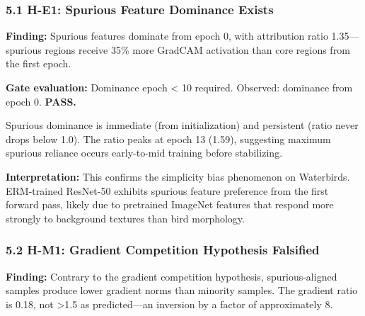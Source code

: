 
\subsubsection{5.1 H-E1: Spurious Feature Dominance Exists}

\textbf{Finding:} Spurious features dominate from epoch 0, with attribution ratio 1.35---spurious regions receive 35\% more GradCAM activation than core regions from the first epoch.

\begin{table}[htbp]
\centering
{}
\end{table}

\textbf{Gate evaluation:} Dominance epoch < 10 required. Observed: dominance from epoch 0. \textbf{PASS.}

Spurious dominance is immediate (from initialization) and persistent (ratio never drops below 1.0). The ratio peaks at epoch 13 (1.59), suggesting maximum spurious reliance occurs early-to-mid training before stabilizing.

\textbf{Interpretation:} This confirms the simplicity bias phenomenon on Waterbirds. ERM-trained ResNet-50 exhibits spurious feature preference from the first forward pass, likely due to pretrained ImageNet features that respond more strongly to background textures than bird morphology.

\subsubsection{5.2 H-M1: Gradient Competition Hypothesis Falsified}

\textbf{Finding:} Contrary to the gradient competition hypothesis, spurious-aligned samples produce lower gradient norms than minority samples. The gradient ratio is 0.18, not >1.5 as predicted---an inversion by a factor of approximately 8.

\begin{table}[htbp]
\centering
{}
\end{table}

